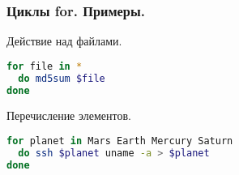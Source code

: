 \begin{frame}[fragile]
\frametitle{ Циклы for. Примеры.}
  \begin{block}{Действие над файлами.}
\begin{lstlisting}[language=bash,frame=single]
for file in *
  do md5sum $file
done
\end{lstlisting}
  \end{block}

\begin{block}{Перечисление элементов.}
\begin{lstlisting}[language=bash,frame=single]
for planet in Mars Earth Mercury Saturn
  do ssh $planet uname -a > $planet 
done
\end{lstlisting}
  \end{block}
\end{frame}
